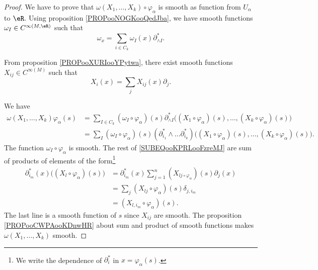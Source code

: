 \begin{proof}

	We have to prove that \( \omega(X_1,\ldots,X_k)\circ \varphi_{\alpha}\) is smooth as function from \( U_{\alpha}\) to \( \eR\). Using proposition \ref{PROPooNOGKooQedJba}, we have smooth functions \( \omega_I\in C^{\infty(M,\eR)}\) such that
	\begin{equation}
		\omega_x=\sum_{i\in C_k}\omega_I(x)\partial^*_{\wedge I}.
	\end{equation}

	From proposition \ref{PROPooXURIooYPytwa}, there exist smooth functions \( X_{ij}\in C^{\infty(M)}\) such that
	\begin{equation}
		X_i(x)=\sum_jX_{ij}(x)\partial_j.
	\end{equation}


	We have
	\begin{subequations}
		\begin{align}
			\omega(X_1,\ldots,X_k)\varphi_{\alpha}(s) & =\sum_{I\in C_k}(\omega_I\circ\varphi_{\alpha})(s)\partial_{\wedge I}^*\Big( (X_1\circ\varphi_{\alpha})(s),\ldots,(X_k\circ \varphi_{\alpha})(s) \Big)                                               \\
			                                          & =\sum_I(\omega_I\circ\varphi_{\alpha})(s)(\partial^*_{i_1}\wedge\ldots\partial_{i_k}^*)  \Big( (X_1\circ\varphi_{\alpha})(s),\ldots,(X_k\circ \varphi_{\alpha})(s) \Big).		\label{SUBEQooKPRLooFzreMJ}
		\end{align}
	\end{subequations}
	The function \( \omega_I\circ\varphi_{\alpha}\) is smooth. The rest of \eqref{SUBEQooKPRLooFzreMJ} are sum of products of elements of the form\footnote{We write the dependence of \( \partial_i^*\) in \( x=\varphi_{\alpha}(s)\).}
	\begin{subequations}
		\begin{align}
			\partial_{i_m}^*(x)\Big( (X_l\circ\varphi_{\alpha})(s) \Big) & = \partial^*_{i_m}(x)\sum_{j=1}^n(X_{lj\circ\varphi_{\alpha}})(s)\partial_j(x) \\
			                                                             & = \sum_j (X_{lj}\circ \varphi_{\alpha})(s)\delta_{j,i_m}                       \\
			                                                             & = (X_{l,i_m}\circ\varphi_{\alpha})(s).
		\end{align}
	\end{subequations}
	The last line is a smooth function of \( s\) since \( X_{ij}\) are smooth. The proposition \ref{PROPooCWPAooKDnwHR} about sum and product of smooth functions makes \( \omega(X_1,\ldots,X_k)\) smooth.
\end{proof}


